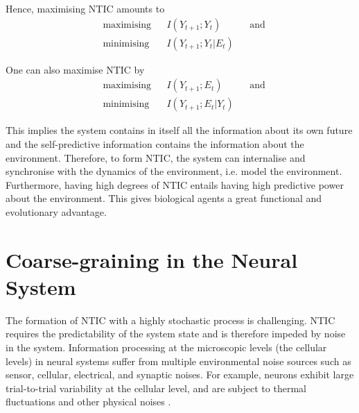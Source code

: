 \documentclass[utf8]{article}
\begin{document}
			\noindent
			Hence, maximising NTIC amounts to
				\begin{equation}
    				\label{eq:nticObjective}
    				\begin{aligned}
    				& \text{maximising} & { } & I(Y_{t+1};Y_{t}) & { } & \text{and} \\
    				& \text{minimising} & { } & I(Y_{t+1};Y_{t}|E_{t}) & { }
    				\end{aligned}
				\end{equation}
				
			One can also maximise NTIC by 
				\begin{equation}
    				\label{eq:nticObjective2}
    				\begin{aligned}
    				& \text{maximising} & { } & I(Y_{t+1};E_{t}) & { } & \text{and} \\
    				& \text{minimising} & { } & I(Y_{t+1};E_{t}|Y_{t}) & { }
    				\end{aligned}
				\end{equation}			

			\noindent
			This implies the system contains in itself all the information about its own future and the self-predictive information contains the information about the environment. Therefore, to form NTIC, the system can internalise and synchronise with the dynamics of the environment, i.e. model the environment. Furthermore, having high degrees of NTIC entails having high predictive power about the environment. This gives biological agents a great functional and evolutionary advantage. 
			

	\section{Coarse-graining in the Neural System} \label{sec:Neural coarse-graining}

		The formation of NTIC with a  highly stochastic process is challenging. NTIC requires the predictability of the system state and is therefore impeded by noise in the system. Information processing at the microscopic levels (the cellular levels) in neural systems suffer from multiple environmental noise sources such as sensor, cellular, electrical, and synaptic noises. For example, neurons exhibit large trial-to-trial variability at the cellular level, and are subject to thermal fluctuations and other physical noises \citep{faisal2008noise}. 
		
\end{document}
